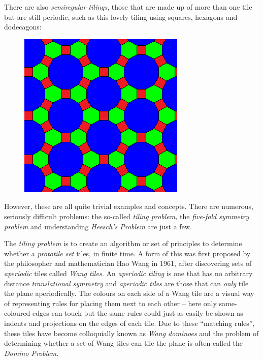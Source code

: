 There are also \emph{semiregular tilings}, those that are made up of
more than one tile but are still periodic, such as this lovely tiling
using squares, hexagons and dodecagons:

\begin{figure}[htbp]
\centering
\includegraphics{image_6.png}
\caption{}
\end{figure}

However, these are all quite trivial examples and concepts. There are
numerous, seriously difficult problems: the so-called \emph{tiling
problem,} the \emph{five-fold symmetry problem} and understanding
\emph{Heesch's Problem} are just a few.

The \emph{tiling problem} is to create an algorithm or set of principles
to determine whether a \emph{prototile set} tiles, in finite time. A
form of this was first proposed by the philosopher and mathematician Hao
Wang in 1961, after discovering sets of \emph{aperiodic} tiles called
\emph{Wang tiles.} An \emph{aperiodic tiling} is one that has no
arbitrary distance \emph{translational symmetry} and \emph{aperiodic
tiles} are those that can \emph{only} tile the plane aperiodically. The
colours on each side of a Wang tile are a visual way of representing
rules for placing them next to each other -- here only same-coloured
edges can touch but the same rules could just as easily be shown as
indents and projections on the edges of each tile. Due to these
``matching rules'', these tiles have become colloquially known as
\emph{Wang dominoes} and the problem of determining whether a set of
Wang tiles can tile the plane is often called the \emph{Domino Problem.}

